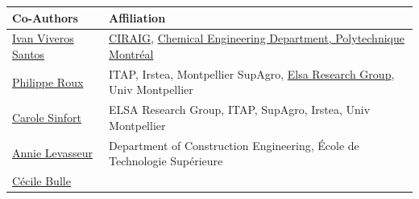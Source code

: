\documentclass[openany]{book}
\begin{document}
\begin{longtable}[]{@{}ll@{}}
\toprule
\begin{minipage}[b]{0.43\columnwidth}\raggedright
Co-Authors\strut
\end{minipage} & \begin{minipage}[b]{0.51\columnwidth}\raggedright
Affiliation\strut
\end{minipage}\tabularnewline
\midrule
\endhead
\begin{minipage}[t]{0.43\columnwidth}\raggedright
\href{https://ca.linkedin.com/in/ivan-viveros-santos}{Ivan Viveros Santos}\strut
\end{minipage} & \begin{minipage}[t]{0.51\columnwidth}\raggedright
\href{http://www.ciraig.org/fr/}{CIRAIG}, \href{https://www.polymtl.ca/gch/}{Chemical Engineering Department, Polytechnique Montréal}\strut
\end{minipage}\tabularnewline
\begin{minipage}[t]{0.43\columnwidth}\raggedright
\href{http://www.elsa-lca.org/?p=137\&lang=en}{Philippe Roux}\strut
\end{minipage} & \begin{minipage}[t]{0.51\columnwidth}\raggedright
ITAP, Irstea, Montpellier SupAgro, \href{http://www.elsa-lca.org/?lang=en}{Elsa Research Group}, Univ Montpellier\strut
\end{minipage}\tabularnewline
\begin{minipage}[t]{0.43\columnwidth}\raggedright
\href{http://www.elsa-lca.org/?tag=carole-sinfort\&lang=en}{Carole Sinfort}\strut
\end{minipage} & \begin{minipage}[t]{0.51\columnwidth}\raggedright
ELSA Research Group, ITAP, SupAgro, Irstea, Univ Montpellier\strut
\end{minipage}\tabularnewline
\begin{minipage}[t]{0.43\columnwidth}\raggedright
\href{https://www.etsmtl.ca/en/research/professors/alevasseur/}{Annie Levasseur}\strut
\end{minipage} & \begin{minipage}[t]{0.51\columnwidth}\raggedright
Department of Construction Engineering, École de Technologie Supérieure\strut
\end{minipage}\tabularnewline
\begin{minipage}[t]{0.43\columnwidth}\raggedright
\href{https://professeurs.uqam.ca/professeur/bulle.cecile/}{Cécile Bulle}\strut
\end{minipage} & \begin{minipage}[t]{0.51\columnwidth}\raggedright

\end{minipage}
\end{longtable}
\end{document}
